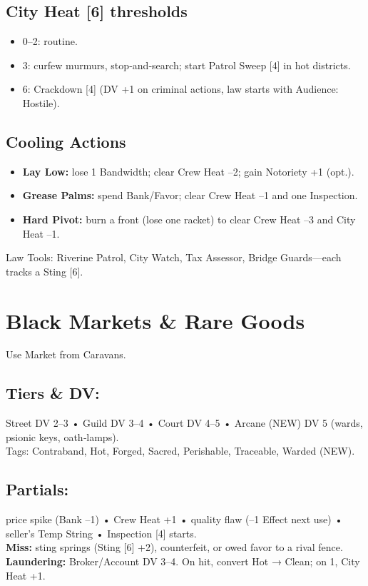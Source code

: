 \documentclass[11pt]{article}
\begin{document}
\subsection*{City Heat [6] thresholds}
\begin{itemize}
\item 0--2: routine.
\item 3: curfew murmurs, stop‑and‑search; start Patrol Sweep [4] in hot districts.
\item 6: Crackdown [4] (DV +1 on criminal actions, law starts with Audience: Hostile).
\end{itemize}

\subsection*{Cooling Actions}
\begin{itemize}
\item \textbf{Lay Low:} lose 1 Bandwidth; clear Crew Heat --2; gain Notoriety +1 (opt.).
\item \textbf{Grease Palms:} spend Bank/Favor; clear Crew Heat --1 and one Inspection.
\item \textbf{Hard Pivot:} burn a front (lose one racket) to clear Crew Heat --3 and City Heat --1.
\end{itemize}

Law Tools: Riverine Patrol, City Watch, Tax Assessor, Bridge Guards---each tracks a Sting [6].

\section{Black Markets \& Rare Goods}
Use Market from Caravans.

\subsection*{Tiers \& DV:} Street DV 2--3 • Guild DV 3--4 • Court DV 4--5 • Arcane (NEW) DV 5 (wards, psionic keys, oath‑lamps). \\
Tags: Contraband, Hot, Forged, Sacred, Perishable, Traceable, Warded (NEW).

\subsection*{Partials:} price spike (Bank --1) • Crew Heat +1 • quality flaw (--1 Effect next use) • seller's Temp String • Inspection [4] starts. \\
\textbf{Miss:} sting springs (Sting [6] +2), counterfeit, or owed favor to a rival fence. \\
\textbf{Laundering:} Broker/Account DV 3--4. On hit, convert Hot → Clean; on 1, City Heat +1.
\end{document}
